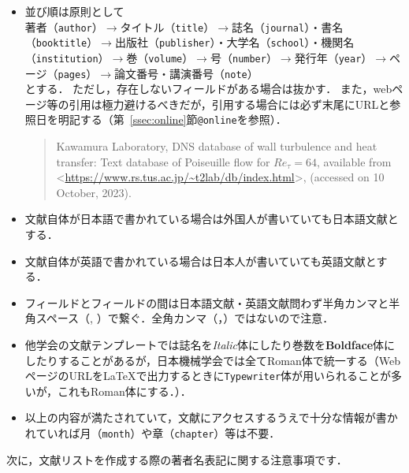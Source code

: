\documentclass[a4paper,fleqn,uplatex,dvipdfmx]{jsarticle}
\begin{document}
\begin{itembox}[l]{}
    \begin{itemize}
        \item 並び順は原則として \\
            著者（\verb|author|）$\to$タイトル（\verb|title|）$\to$誌名（\verb|journal|）・書名（\verb|booktitle|）$\to$出版社（\verb|publisher|）・大学名（\verb|school|）・機関名（\verb|institution|）$\to$巻（\verb|volume|）$\to$号（\verb|number|）$\to$発行年（\verb|year|）$\to$ページ（\verb|pages|）$\to$論文番号・講演番号（\verb|note|） \\
            とする．
            ただし，存在しないフィールドがある場合は抜かす．
            また，webページ等の引用は極力避けるべきだが，引用する場合には必ず末尾にURLと参照日を明記する（第~\ref{ssec:online}節\verb|@online|を参照）．
            \begin{quote}
                Kawamura Laboratory, DNS database of wall turbulence and heat transfer: Text database of Poiseuille flow for $\mathit{Re}_\tau = 64$, available from \textless\url{https://www.rs.tus.ac.jp/~t2lab/db/index.html}\textgreater, (accessed on 10 October, 2023).
            \end{quote}
        \item 文献自体が日本語で書かれている場合は外国人が書いていても日本語文献とする．
        \item 文献自体が英語で書かれている場合は日本人が書いていても英語文献とする．
        \item フィールドとフィールドの間は日本語文献・英語文献問わず半角カンマと半角スペース（, ）で繋ぐ．全角カンマ（，）ではないので注意．
        \item 他学会の文献テンプレートでは誌名を\textit{Italic}体にしたり巻数を\textbf{Boldface}体にしたりすることがあるが，日本機械学会では全て\textrm{Roman}体で統一する（WebページのURLを\LaTeX{}で出力するときに\texttt{Typewriter}体が用いられることが多いが，これも\textrm{Roman}体にする．）．
        \item 以上の内容が満たされていて，文献にアクセスするうえで十分な情報が書かれていれば月（\verb|month|）や章（\verb|chapter|）等は不要．
    \end{itemize}
\end{itembox}
次に，文献リストを作成する際の著者名表記に関する注意事項です．
\renewcommand\UrlFont{\ttfamily}
\end{document}
